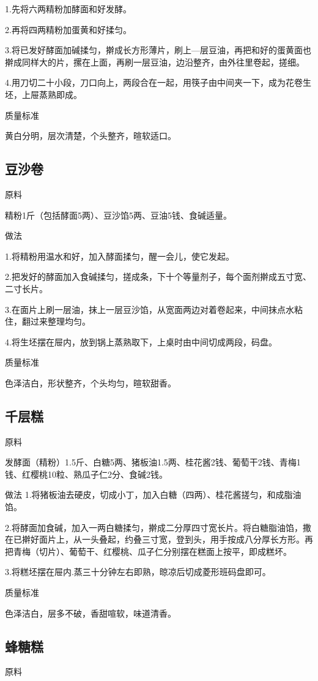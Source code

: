 \documentclass{ctexbook}
\begin{document}
1.先将六两精粉加酵面和好发酵。

2.再将四两精粉加蛋黄和好揉匀。

3.将已发好酵面加碱揉匀，擀成长方形薄片，刷上—层豆油，再把和好的蛋黄面也擀成同样大的片，摞在上面，再刷一层豆油，边沿整齐，由外往里卷起，搓细。

4.用刀切二十小段，刀口向上，两段合在一起，用筷子由中间夹一下，成为花卷生坯，上屉蒸熟即成。

质量标准

黄白分明，层次清楚，个头整齐，暄软适口。
\subsection{豆沙卷}
原料

精粉1斤（包括酵面5两）、豆沙馅5两、豆油5钱、食碱适量。

做法

1.将精粉用温水和好，加入酵面揉匀，醒一会儿，使它发起。

2.把发好的酵面加入食碱揉匀，搓成条，下十个等量剂子，每个面剂擀成五寸宽、二寸长片。

3.在面片上刷一层油，抹上一层豆沙馅，从宽面两边对着卷起来，中间抹点水粘住，翻过来整理均匀。

4.将生坯摆在屉内，放到锅上蒸熟取下，上桌时由中间切成两段，码盘。

质量标准

色泽洁白，形状整齐，个头均匀，暄软甜香。
\subsection{千层糕}
原料

发酵面（精粉）1.5斤、白糖5两、猪板油1.5两、桂花酱2钱、葡萄干2钱、青梅1钱、红樱桃10粒、熟瓜子仁2分、食碱2钱。

做法
1.将猪板油去硬皮，切成小丁，加入白糖（四两）、桂花酱搓匀，和成脂油馅。

2.将酵面加食碱，加入一两白糖揉匀，擀成二分厚四寸宽长片。将白糖脂油馅，撒在已擀好面片上，从一头叠起，约叠三寸宽，登到头，用手按成八分厚长方形。再把青梅（切片）、葡萄干、红樱桃、瓜子仁分别摆在糕面上按平，即成糕坏。

3.将糕坯摆在屉内.蒸三十分钟左右即熟，晾凉后切成菱形班码盘即可。

质量标准

色泽洁白，层多不破，香甜喧软，味道清香。
\subsection{蜂糖糕}
原料
\end{document}
